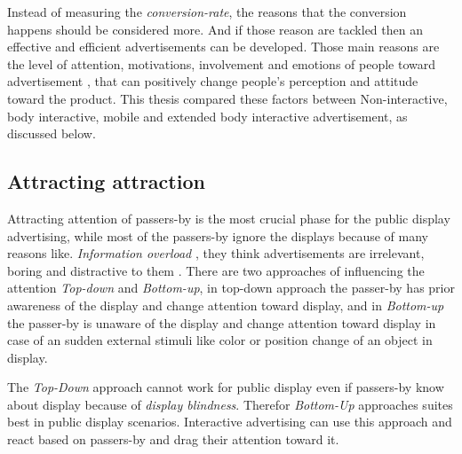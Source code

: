 Instead of measuring the \emph{conversion-rate}, the reasons that the conversion happens should be considered more. And if those reason are tackled then an effective and efficient advertisements can be developed. Those main reasons are the level of attention, motivations, involvement and emotions of people toward advertisement \cite{pervasiv_ad}, that can positively change people’s perception and attitude toward the product. This thesis compared these factors between Non-interactive, body interactive, mobile and extended body interactive advertisement, as discussed below.

\subsection{Attracting attraction}
Attracting attention of passers-by is the most crucial phase for the public display advertising, while most of the passers-by ignore the displays because of many reasons like. \emph{Information overload} \cite{Information_overload}, they think advertisements are irrelevant, boring and distractive to them \cite{banner_blindness, display_blindness}. There are two approaches of influencing the attention \emph{Top-down} and \emph{Bottom-up}, in top-down approach the passer-by has prior awareness of the display and change attention toward display, and in \emph{Bottom-up} the passer-by is unaware of the display and change attention toward display in case of an sudden external stimuli like color \cite{Luminance} or position \cite{capturingattention} change of an object in display.  

The \emph{Top-Down} approach cannot work for public display even if passers-by know about display because of \emph{display blindness}. Therefor \emph{Bottom-Up} approaches suites best in public display scenarios. Interactive advertising can use this approach and react based on passers-by and drag their attention toward it.



